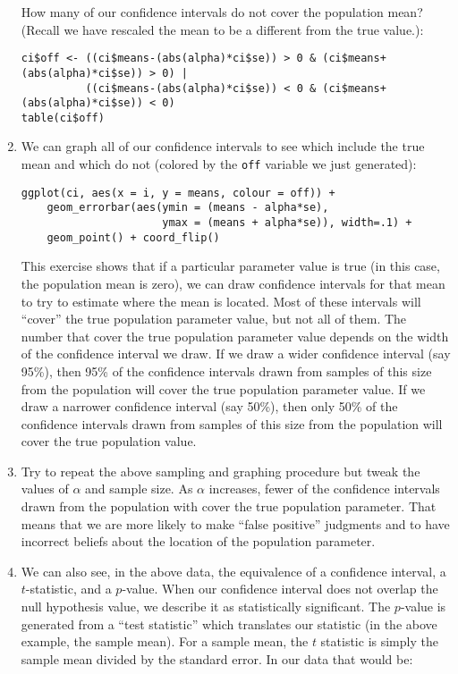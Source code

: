 \documentclass[a4paper,12pt]{article}
\begin{document}
\begin{enumerate}
How many of our confidence intervals do not cover the population mean? (Recall we have rescaled the mean to be a different from the true value.):

\begin{verbatim}
ci$off <- ((ci$means-(abs(alpha)*ci$se)) > 0 & (ci$means+(abs(alpha)*ci$se)) > 0) | 
          ((ci$means-(abs(alpha)*ci$se)) < 0 & (ci$means+(abs(alpha)*ci$se)) < 0)
table(ci$off)
\end{verbatim}
 
\item We can graph all of our confidence intervals to see which include the true mean and which do not (colored by the \texttt{off} variable we just generated):

\begin{verbatim}
ggplot(ci, aes(x = i, y = means, colour = off)) + 
    geom_errorbar(aes(ymin = (means - alpha*se), 
                      ymax = (means + alpha*se)), width=.1) + 
    geom_point() + coord_flip()
\end{verbatim}

\noindent This exercise shows that if a particular parameter value is true (in this case, the population mean is zero), we can draw confidence intervals for that mean to try to estimate where the mean is located. Most of these intervals will ``cover'' the true population parameter value, but not all of them. The number that cover the true population parameter value depends on the width of the confidence interval we draw. If we draw a wider confidence interval (say 95\%), then 95\% of the confidence intervals drawn from samples of this size from the population will cover the true population parameter value. If we draw a narrower confidence interval (say 50\%), then only 50\% of the confidence intervals drawn from samples of this size from the population will cover the true population value. 

\item Try to repeat the above sampling and graphing procedure but tweak the values of $\alpha$ and sample size. As $\alpha$ increases, fewer of the confidence intervals drawn from the population with cover the true population parameter. That means that we are more likely to make ``false positive'' judgments and to have incorrect beliefs about the location of the population parameter.

\item We can also see, in the above data, the equivalence of a confidence interval, a $t$-statistic, and a $p$-value. When our confidence interval does not overlap the null hypothesis value, we describe it as statistically significant. The $p$-value is generated from a ``test statistic'' which translates our statistic (in the above example, the sample mean). For a sample mean, the $t$ statistic is simply the sample mean divided by the standard error. In our data that would be:


\end{enumerate}
\end{document}
